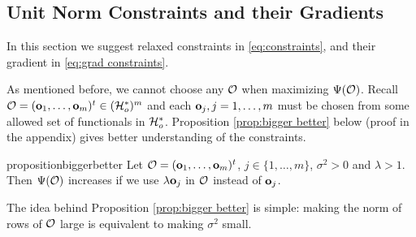 \documentclass{amsart}
\numberwithin{equation}{section}
\begin{document}
\subsection{Unit Norm Constraints and their Gradients}\label{subsec:unit norm}
In this section we suggest relaxed constraints in
\eqref{eq:constraints}, and their gradient in \eqref{eq:grad
  constraints}.

As mentioned before, we cannot choose any $\mathcal{O}$ when maximizing
$\Psi(\mathcal{O})$. Recall $\mathcal{O} = (\mathbf{o}_1,\dots,\mathbf{o}_m)^t \in
(\mathcal{H}_o^*)^m$ and each $\mathbf{o}_j,j=1,\dots,m$ must be chosen from some
allowed set of functionals in $\mathcal{H}_o^*$. %
Proposition \ref{prop:bigger better} below (proof in the appendix)
gives better understanding of the constraints.
\begin{restatable*}{proposition}{biggerbetter}\label{prop:bigger better}
  Let $\mathcal{O} = (\mathbf{o}_1,\dots,\mathbf{o}_m)^t$, $j \in \{1,\dots,m\}$, $\sigma^2
  > 0$ and $\lambda > 1$. Then $\Psi(\mathcal{O})$ increases if we use
  $\lambda \mathbf{o}_j$ in $\mathcal{O}$ instead of $\mathbf{o}_j$.
\end{restatable*}
The idea behind Proposition \ref{prop:bigger better} is simple: making
the norm of rows of $\mathcal{O}$ large is equivalent to making $\sigma^2$
small. %
\end{document}
